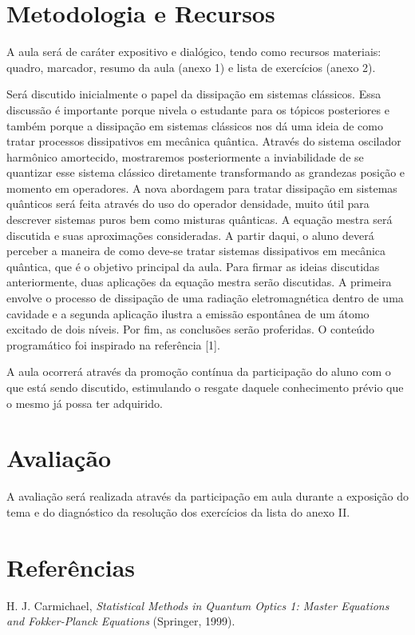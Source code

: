 \documentclass{article}
\begin{document}
\section{Metodologia e Recursos}

A aula será de caráter expositivo e dialógico, tendo como recursos materiais: quadro, marcador, resumo da aula (anexo 1) e lista de exercícios (anexo 2).

Será discutido inicialmente o papel da dissipação em sistemas clássicos. Essa discussão é importante porque nivela o estudante para os tópicos posteriores e também porque a dissipação em sistemas clássicos nos dá uma ideia de como tratar processos dissipativos em mecânica quântica. Através do sistema oscilador harmônico amortecido, mostraremos posteriormente a inviabilidade de se quantizar esse sistema clássico diretamente transformando as grandezas posição e momento em operadores. A nova abordagem para tratar dissipação em sistemas quânticos será feita através do uso do operador densidade, muito útil para descrever sistemas puros bem como misturas quânticas. A equação mestra será discutida e suas aproximações consideradas. A partir daqui, o aluno deverá perceber a maneira de como deve-se tratar sistemas dissipativos em mecânica quântica, que é o objetivo principal da aula. Para firmar as ideias discutidas anteriormente, duas aplicações da equação mestra serão discutidas. A primeira envolve o processo de dissipação de uma radiação eletromagnética dentro de uma cavidade e a segunda aplicação ilustra a emissão espontânea de um átomo excitado de dois níveis. Por fim, as conclusões serão proferidas. O conteúdo programático foi inspirado na referência [1].

A aula ocorrerá através da promoção contínua da participação do aluno com o que está sendo discutido, estimulando o resgate daquele conhecimento prévio que o mesmo já possa ter adquirido.

\section{Avaliação}

A avaliação será realizada através da participação em aula durante a exposição do tema e do diagnóstico da resolução dos exercícios da lista do anexo II. 

\section{Referências}

\noindent [1] H. J. Carmichael, \textit{Statistical Methods in Quantum Optics 1: Master Equations and Fokker-Planck Equations} (Springer, 1999).
\end{document}
